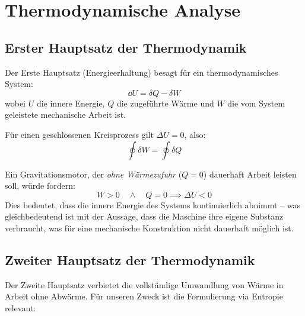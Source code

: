 ﻿\documentclass[12pt, a4paper]{report}
\theoremstyle{definition}
\theoremstyle{remark}
\begin{document}
\chapter{Thermodynamische Analyse}
\label{sec:thermodynamik}

\section{Erster Hauptsatz der Thermodynamik}

Der Erste Hauptsatz (Energieerhaltung) besagt für ein thermodynamisches System:
\begin{equation}
  \dd U = \delta Q - \delta W
  \label{eq:1hs}
\end{equation}
wobei $U$ die innere Energie, $Q$ die zugeführte Wärme und $W$ die vom System
geleistete mechanische Arbeit ist.

Für einen geschlossenen Kreisprozess gilt $\Delta U = 0$, also:
\begin{equation}
  \oint \delta W = \oint \delta Q
\end{equation}

Ein Gravitationsmotor, der \emph{ohne Wärmezufuhr} ($Q = 0$) dauerhaft Arbeit
leisten soll, würde fordern:
\begin{equation}
  W > 0 \quad \wedge \quad Q = 0 \implies \Delta U < 0
\end{equation}
Dies bedeutet, dass die innere Energie des Systems kontinuierlich abnimmt --
was gleichbedeutend ist mit der Aussage, dass die Maschine ihre eigene
Substanz verbraucht, was für eine mechanische Konstruktion nicht dauerhaft
möglich ist.

\section{Zweiter Hauptsatz der Thermodynamik}

Der Zweite Hauptsatz verbietet die vollständige Umwandlung von Wärme in Arbeit
ohne Abwärme. Für unseren Zweck ist die Formulierung via Entropie relevant:
\end{document}
